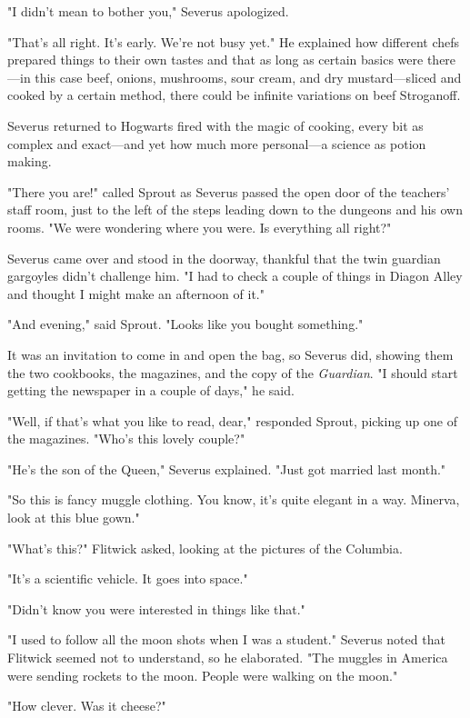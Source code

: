 "I didn't mean to bother you," Severus apologized.

"That's all right. It's early. We're not busy yet." He explained how different chefs prepared things to their own tastes and that as long as certain basics were there—in this case beef, onions, mushrooms, sour cream, and dry mustard—sliced and cooked by a certain method, there could be infinite variations on beef Stroganoff.

Severus returned to Hogwarts fired with the magic of cooking, every bit as complex and exact—and yet how much more personal—a science as potion making.

"There you are!" called Sprout as Severus passed the open door of the teachers' staff room, just to the left of the steps leading down to the dungeons and his own rooms. "We were wondering where you were. Is everything all right?"

Severus came over and stood in the doorway, thankful that the twin guardian gargoyles didn't challenge him. "I had to check a couple of things in Diagon Alley and thought I might make an afternoon of it."

"And evening," said Sprout. "Looks like you bought something."

It was an invitation to come in and open the bag, so Severus did, showing them the two cookbooks, the magazines, and the copy of the \emph{Guardian}. "I should start getting the newspaper in a couple of days," he said.

"Well, if that's what you like to read, dear," responded Sprout, picking up one of the magazines. "Who's this lovely couple?"

"He's the son of the Queen," Severus explained. "Just got married last month."

"So this is fancy muggle clothing. You know, it's quite elegant in a way. Minerva, look at this blue gown."

"What's this?" Flitwick asked, looking at the pictures of the Columbia.

"It's a scientific vehicle. It goes into space."

"Didn't know you were interested in things like that."

"I used to follow all the moon shots when I was a student." Severus noted that Flitwick seemed not to understand, so he elaborated. "The muggles in America were sending rockets to the moon. People were walking on the moon."

"How clever. Was it cheese?"

